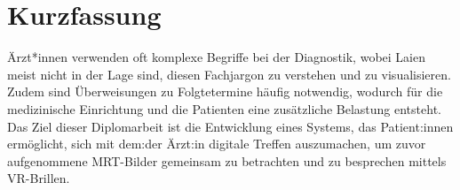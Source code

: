 \section{Kurzfassung}
Ärzt*innen verwenden oft komplexe Begriffe bei der Diagnostik, wobei Laien meist nicht in der Lage sind, diesen Fachjargon zu verstehen und zu visualisieren.
Zudem sind Überweisungen zu Folgtetermine häufig notwendig, wodurch für die medizinische Einrichtung und die Patienten eine zusätzliche Belastung entsteht. 
Das Ziel dieser Diplomarbeit ist die Entwicklung eines Systems, das Patient:innen ermöglicht, sich mit dem:der Ärzt:in digitale Treffen auszumachen, um zuvor aufgenommene
MRT-Bilder gemeinsam zu betrachten und zu besprechen mittels VR-Brillen.